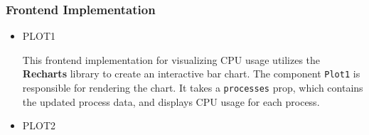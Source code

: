 \documentclass[12pt]{article}
\begin{document}
\subsubsection{Frontend Implementation}
\begin{itemize}
    \item PLOT1



This frontend implementation for visualizing CPU usage utilizes the \textbf{Recharts} library to create an interactive bar chart. The component \texttt{Plot1} is responsible for rendering the chart. It takes a \texttt{processes} prop, which contains the updated process data, and displays CPU usage for each process.



\item PLOT2






\end{itemize}
\end{document}
